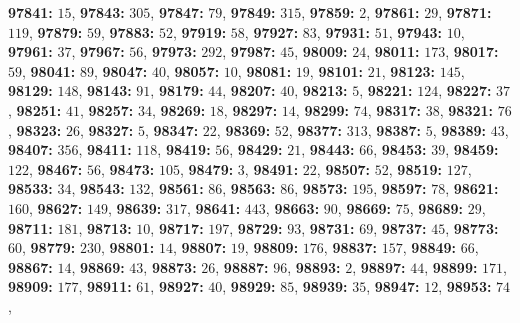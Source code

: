 \textsf{\bfseries 97841:} $15$, \textsf{\bfseries 97843:} $305$, \textsf{\bfseries 97847:} $79$, \textsf{\bfseries 97849:} $315$, \textsf{\bfseries 97859:} $2$, \textsf{\bfseries 97861:} $29$, \textsf{\bfseries 97871:} $119$, \textsf{\bfseries 97879:} $59$, \textsf{\bfseries 97883:} $52$, \textsf{\bfseries 97919:} $58$, \textsf{\bfseries 97927:} $83$, \textsf{\bfseries 97931:} $51$, \textsf{\bfseries 97943:} $10$, \textsf{\bfseries 97961:} $37$, \textsf{\bfseries 97967:} $56$, \textsf{\bfseries 97973:} $292$, \textsf{\bfseries 97987:} $45$, \textsf{\bfseries 98009:} $24$, \textsf{\bfseries 98011:} $173$, \textsf{\bfseries 98017:} $59$, \textsf{\bfseries 98041:} $89$, \textsf{\bfseries 98047:} $40$, \textsf{\bfseries 98057:} $10$, \textsf{\bfseries 98081:} $19$, \textsf{\bfseries 98101:} $21$, \textsf{\bfseries 98123:} $145$, \textsf{\bfseries 98129:} $148$, \textsf{\bfseries 98143:} $91$, \textsf{\bfseries 98179:} $44$, \textsf{\bfseries 98207:} $40$, \textsf{\bfseries 98213:} $5$, \textsf{\bfseries 98221:} $124$, \textsf{\bfseries 98227:} $37$, \textsf{\bfseries 98251:} $41$, \textsf{\bfseries 98257:} $34$, \textsf{\bfseries 98269:} $18$, \textsf{\bfseries 98297:} $14$, \textsf{\bfseries 98299:} $74$, \textsf{\bfseries 98317:} $38$, \textsf{\bfseries 98321:} $76$, \textsf{\bfseries 98323:} $26$, \textsf{\bfseries 98327:} $5$, \textsf{\bfseries 98347:} $22$, \textsf{\bfseries 98369:} $52$, \textsf{\bfseries 98377:} $313$, \textsf{\bfseries 98387:} $5$, \textsf{\bfseries 98389:} $43$, \textsf{\bfseries 98407:} $356$, \textsf{\bfseries 98411:} $118$, \textsf{\bfseries 98419:} $56$, \textsf{\bfseries 98429:} $21$, \textsf{\bfseries 98443:} $66$, \textsf{\bfseries 98453:} $39$, \textsf{\bfseries 98459:} $122$, \textsf{\bfseries 98467:} $56$, \textsf{\bfseries 98473:} $105$, \textsf{\bfseries 98479:} $3$, \textsf{\bfseries 98491:} $22$, \textsf{\bfseries 98507:} $52$, \textsf{\bfseries 98519:} $127$, \textsf{\bfseries 98533:} $34$, \textsf{\bfseries 98543:} $132$, \textsf{\bfseries 98561:} $86$, \textsf{\bfseries 98563:} $86$, \textsf{\bfseries 98573:} $195$, \textsf{\bfseries 98597:} $78$, \textsf{\bfseries 98621:} $160$, \textsf{\bfseries 98627:} $149$, \textsf{\bfseries 98639:} $317$, \textsf{\bfseries 98641:} $443$, \textsf{\bfseries 98663:} $90$, \textsf{\bfseries 98669:} $75$, \textsf{\bfseries 98689:} $29$, \textsf{\bfseries 98711:} $181$, \textsf{\bfseries 98713:} $10$, \textsf{\bfseries 98717:} $197$, \textsf{\bfseries 98729:} $93$, \textsf{\bfseries 98731:} $69$, \textsf{\bfseries 98737:} $45$, \textsf{\bfseries 98773:} $60$, \textsf{\bfseries 98779:} $230$, \textsf{\bfseries 98801:} $14$, \textsf{\bfseries 98807:} $19$, \textsf{\bfseries 98809:} $176$, \textsf{\bfseries 98837:} $157$, \textsf{\bfseries 98849:} $66$, \textsf{\bfseries 98867:} $14$, \textsf{\bfseries 98869:} $43$, \textsf{\bfseries 98873:} $26$, \textsf{\bfseries 98887:} $96$, \textsf{\bfseries 98893:} $2$, \textsf{\bfseries 98897:} $44$, \textsf{\bfseries 98899:} $171$, \textsf{\bfseries 98909:} $177$, \textsf{\bfseries 98911:} $61$, \textsf{\bfseries 98927:} $40$, \textsf{\bfseries 98929:} $85$, \textsf{\bfseries 98939:} $35$, \textsf{\bfseries 98947:} $12$, \textsf{\bfseries 98953:} $74$, 
